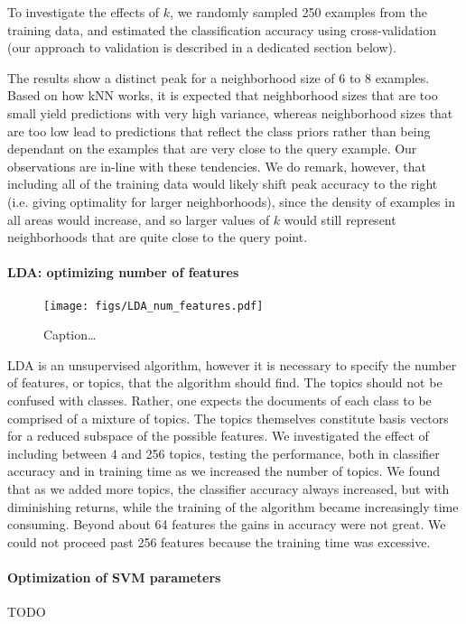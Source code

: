 \documentclass[conference,letterpaper]{IEEEtran}
\begin{document}
To investigate the effects of $k$, we randomly sampled 250 examples from the
training data, and estimated the classification accuracy using 
cross-validation (our approach to validation is described in a dedicated 
section below).  

The results show a distinct peak for a neighborhood size of 6 to 8 examples.
Based on how kNN works, it is expected that neighborhood sizes that are 
too small yield predictions with very high variance, whereas neighborhood 
sizes that are too low lead to predictions that reflect the class priors
rather than being dependant on the examples that are very close to the query 
example.  Our 
observations are in-line with these tendencies.  We do remark, however, that
including all of the training data would likely shift peak accuracy to the
right (i.e. giving optimality for larger neighborhoods), since the density
of examples in all areas would increase, and so larger values of $k$ would 
still represent neighborhoods that are quite close to the query point.



\paragraph*{LDA: optimizing number of features}

\begin{figure}
	\centering
	\texttt{[image: figs/LDA\_num\_features.pdf]}
	\caption{Caption\dots}
	\label{fig:LDA_num_features}
\end{figure}

LDA is an unsupervised algorithm, however it is necessary to specify the 
number of features, or topics, that the algorithm should find.  The topics
should not be confused with classes.  Rather, one expects the documents of 
each class to be comprised of a mixture of topics.  The topics themselves 
constitute basis vectors for a reduced subspace of the possible features.
We investigated the effect of including between 4 and 256 topics, testing the
performance, both in classifier accuracy and in training time as we increased
the number of topics.  We found that as we added more topics, the classifier
accuracy always increased, but with diminishing returns, while the training
of the algorithm became increasingly time consuming.  Beyond about 64 features
the gains in accuracy were not great.  We could not proceed past 256 features
because the training time was excessive.


\paragraph{Optimization of SVM parameters}
TODO
\end{document}
